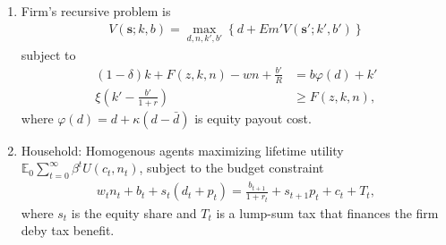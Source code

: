 \documentclass[12pt]{article}
\numberwithin{equation}{section}
\begin{document}
\begin{enumerate}
	Rewriting the enforcement constraint using the budget constraint, we have
	\begin{align*}
		\frac{\xi_t}{1-\xi_t} \left[(1-\delta) k_t - b_t - w_t n_t - d_t \right] \geq F(z_t, k_t, n_t).
	\end{align*}
	Therefore, if there is a negative financial shock, that is, $\xi_t$ decreases, then conditional on that the production plan does not change, the firm will have to increase the equity, that is, cut the payout $d_t$. However, if $d_t$ cannot be cut more, then labour will be reduced.

	\item Firm's recursive problem is
	\begin{align*}
		V(\mathbf{s}; k, b) = \max_{d,n,k',b'} \left\{d + Em'V(\mathbf{s}'; k',b')\right\}
	\end{align*}
	subject to
	\begin{align*}
		(1-\delta) k + F(z, k, n) - wn + \frac{b'}{R} &= b \varphi(d) +k'\\
		\xi\left(k'-\frac{b'}{1+r}\right) & \geq F(z,k,n),
	\end{align*}
	where $\varphi(d) = d + \kappa(d-\bar d)$ is equity payout cost.

	\item Household: Homogenous agents maximizing lifetime utility $\mathbb{E}_0 \sum_{t=0}^\infty \beta^t U(c_t, n_t)$, subject to the budget constraint
	\begin{align*}
		w_t n_t + b_t + s_t(d_t+p_t) = \frac{b_{t+1}}{1+r_t} + s_{t+1}p_t + c_t + T_t,
	\end{align*}
	where $s_t$ is the equity share and $T_t$ is a lump-sum tax that finances the firm deby tax benefit. 
\end{enumerate}





\end{document}
